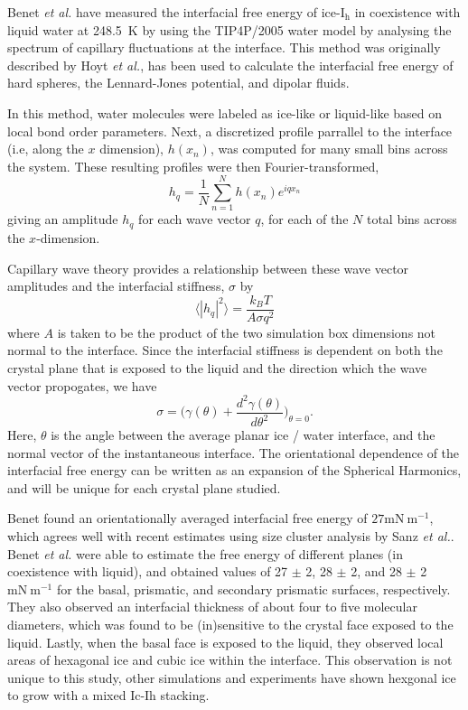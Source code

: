 Benet \textit{et al.} have measured the interfacial free energy of
ice-I$_\mathrm{h}$ in coexistence with liquid water at 248.5~K by
using the TIP4P/2005 water model by analysing the spectrum of
capillary fluctuations at the interface.\cite{Benet2014} This method
was originally described by Hoyt \textit{et al.}\cite{Hoyt2001}, has
been used to calculate the interfacial free energy of hard
spheres,\cite{14} the Lennard-Jones potential,\cite{15} and dipolar
fluids.\cite{16}

In this method, water molecules were labeled as ice-like or
liquid-like based on local bond order parameters. Next, a discretized
profile parrallel to the interface (i.e, along the $x$ dimension),
$h(x_{n})$, was computed for many small bins across the system. These
resulting profiles were then Fourier-transformed,
\begin{equation}
h_{q} = \frac{1}{N}\sum_{n=1}^{N} h(x_{n})e^{iqx_n}
\end{equation}
giving an amplitude $h_{q}$ for each wave vector $q$, for each of the
$N$ total bins across the $x$-dimension. 

Capillary wave theory provides a relationship between these wave
vector amplitudes and the interfacial stiffness, $\sigma$ by
\begin{equation}
\langle |h_{q}|^{2} \rangle = \frac{k_{B}T}{A \sigma q^{2}}
\end{equation}
where $A$ is taken to be the product of the two simulation box
dimensions not normal to the interface. Since the interfacial
stiffness is dependent on both the crystal plane that is exposed to
the liquid and the direction which the wave vector propogates, we have
\begin{equation}
\sigma = \bigg(\gamma (\theta ) + \frac{d^{2}\gamma (\theta )}{d\theta
^{2}} \bigg)_{\theta = 0} .
\end{equation}
Here, $\theta$ is the angle between the average planar ice / water
interface, and the normal vector of the instantaneous interface. The
orientational dependence of the interfacial free energy can be written
as an expansion of the Spherical Harmonics\cite{23}, and will be
unique for each crystal plane studied. 

Benet found an orientationally averaged interfacial free energy of
$27 \mathrm{mN}~\mathrm{m}^{-1}$, which agrees well with recent
estimates using size cluster analysis by Sanz \textit{et
  al.}\cite{Sanz2013}. Benet \textit{et al.} were able to estimate the
free energy of different planes (in coexistence with liquid), and
obtained values of 27 $\pm$ 2, 28 $\pm$ 2, and 28 $\pm$ 2
$\mathrm{mN}~\mathrm{m}^{-1}$ for the basal, prismatic, and secondary
prismatic surfaces, respectively. They also observed an interfacial
thickness of about four to five molecular diameters, which was found
to be (in)sensitive to the crystal face exposed to the liquid. Lastly,
when the basal face is exposed to the liquid, they observed local
areas of hexagonal ice and cubic ice within the interface. This
observation is not unique to this study, other simulations and
experiments have shown hexgonal ice to grow with a mixed Ic-Ih
stacking.\cite{43-47}



